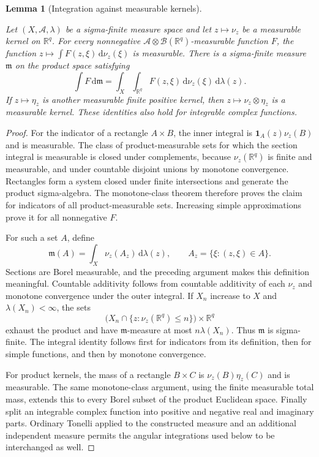 \documentclass[11pt]{amsart}
\newcommand{\R}{\mathbb R}
\newcommand{\dd}{\,\mathrm d}
\newcommand{\one}{\mathbf 1}
\newtheorem{lemma}[theorem]{Lemma}
\theoremstyle{definition}
\theoremstyle{remark}
\numberwithin{equation}{section}
\providecommand{\lean}[1]{}
\providecommand{\leanok}{}
\begin{document}
\begin{lemma}[Integration against measurable kernels]
\label{ext:kernel-integration}
\lean{Auto.ext_kernel_integration_measurable,Auto.ext_kernel_integration_measurable_complex,Auto.ext_kernel_integration_measure,Auto.ext_kernel_integration_prod}
\leanok
Let $(X,\mathcal A,\lambda)$ be a sigma-finite measure space and let
$z\mapsto\nu_z$ be a measurable kernel on $\R^q$.
For every nonnegative $\mathcal A\otimes\mathcal B(\R^q)$-measurable
function $F$, the function
$z\mapsto\int F(z,\xi)\dd\nu_z(\xi)$ is measurable.
There is a sigma-finite measure $\mathfrak m$ on the product space
satisfying
\[
 \int F\dd\mathfrak m
   =\int_X\int_{\R^q}F(z,\xi)\dd\nu_z(\xi)\dd\lambda(z).
\]
If $z\mapsto\eta_z$ is another measurable finite positive kernel,
then $z\mapsto\nu_z\otimes\eta_z$ is a measurable kernel.
These identities also hold for integrable complex functions.
\end{lemma}
\begin{proof}
For the indicator of a rectangle $A\times B$, the inner integral is
$\one_A(z)\nu_z(B)$ and is measurable.  The class of product-measurable
sets for which the section integral is measurable is closed under
complements, because $\nu_z(\R^q)$ is finite and measurable, and under
countable disjoint unions by monotone convergence.  Rectangles form
a system closed under finite intersections and generate the product
sigma-algebra.  The monotone-class theorem therefore proves the
claim for indicators of all product-measurable sets.  Increasing simple
approximations prove it for all nonnegative $F$.

For such a set $A$, define
\[
 \mathfrak m(A)=\int_X\nu_z(A_z)\dd\lambda(z),
 \qquad A_z=\{\xi:(z,\xi)\in A\}.
\]
Sections are Borel measurable, and the preceding argument makes this
definition meaningful.  Countable additivity follows from countable
additivity of each $\nu_z$ and monotone convergence under the outer
integral.  If $X_n$ increase to $X$ and $\lambda(X_n)<\infty$, the sets
\[
 \bigl(X_n\cap\{z:\nu_z(\R^q)\le n\}\bigr)\times\R^q
\]
exhaust the product and have $\mathfrak m$-measure at most
$n\lambda(X_n)$.  Thus $\mathfrak m$ is sigma-finite.
The integral identity follows first for indicators from its definition,
then for simple functions, and then by monotone convergence.

For product kernels, the mass of a rectangle $B\times C$ is
$\nu_z(B)\eta_z(C)$ and is measurable.  The same monotone-class
argument, using the finite measurable total mass, extends this to every
Borel subset of the product Euclidean space.  Finally split an
integrable complex function into positive and negative real and
imaginary parts.  Ordinary Tonelli applied to the constructed measure
and an additional independent measure permits the angular integrations
used below to be interchanged as well.
\end{proof}
\end{document}
